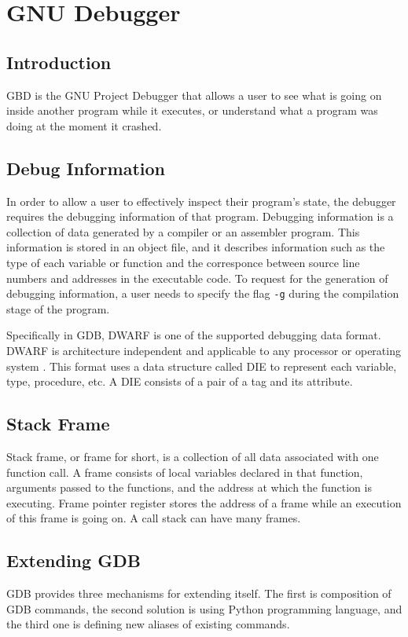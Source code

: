 \chapter{GNU Debugger} \label{GDB}
\section{Introduction}
GBD is the GNU Project Debugger that allows a user to see what is going on
inside another program while it executes, or understand what a program was
doing at the moment it crashed\cite{reference3}.

\section{Debug Information}
In order to allow a user to effectively inspect their program's state, the
debugger requires the debugging information of that program. Debugging
information is a collection of data generated by a compiler or an assembler
program. This information is stored in an object file, and it describes
information such as the type of each variable or function and
the corresponce between source line numbers and addresses in the executable
code\cite{reference6}. To request for the generation of debugging information,
a user needs to specify the flag \verb|-g| during the compilation stage of the
program.

Specifically in GDB, DWARF is one of the supported debugging data format. DWARF is architecture
independent and applicable to any processor or operating system
\cite{reference7}. This format uses a data structure called DIE to represent
each variable, type, procedure, etc. A DIE consists of a pair of a tag
and its attribute\cite{reference8}.

\section{Stack Frame}
Stack frame, or frame for short, is a collection of all data associated with
one function call. A frame consists of local variables declared in that
function, arguments passed to the functions, and the address at which the
function is executing. Frame pointer register stores the address of a frame
while an execution of this frame is going on. A call stack can have many
frames\cite{reference12}.

\section{Extending GDB}
GDB provides three mechanisms for extending itself. The first is
composition of GDB commands, the second solution is using Python programming
language, and the third one is defining new aliases of existing commands.

